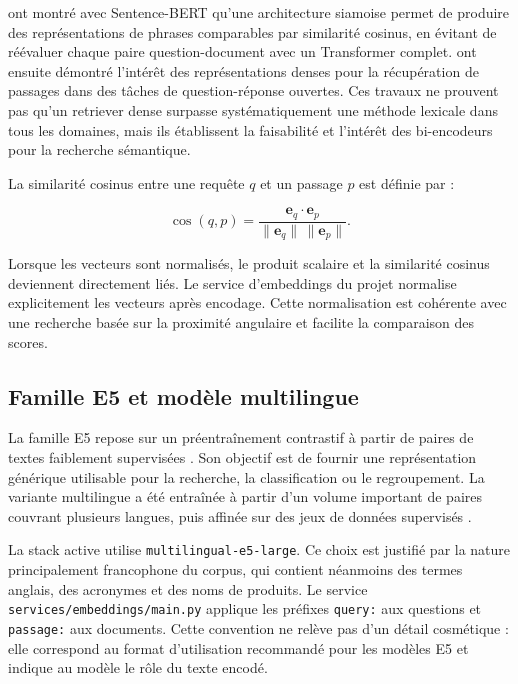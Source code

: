 \citet{Reimers2019} ont montré avec Sentence-BERT qu'une architecture siamoise permet de produire des représentations de phrases comparables par similarité cosinus, en évitant de réévaluer chaque paire question-document avec un Transformer complet. \citet{Karpukhin2020} ont ensuite démontré l'intérêt des représentations denses pour la récupération de passages dans des tâches de question-réponse ouvertes. Ces travaux ne prouvent pas qu'un retriever dense surpasse systématiquement une méthode lexicale dans tous les domaines, mais ils établissent la faisabilité et l'intérêt des bi-encodeurs pour la recherche sémantique.

La similarité cosinus entre une requête $q$ et un passage $p$ est définie par :

\begin{equation}
\operatorname{cos}(q,p)=\frac{\mathbf{e}_q\cdot\mathbf{e}_p}{\lVert\mathbf{e}_q\rVert\,\lVert\mathbf{e}_p\rVert}.
\end{equation}

Lorsque les vecteurs sont normalisés, le produit scalaire et la similarité cosinus deviennent directement liés. Le service d'embeddings du projet normalise explicitement les vecteurs après encodage. Cette normalisation est cohérente avec une recherche basée sur la proximité angulaire et facilite la comparaison des scores.

\subsection{Famille E5 et modèle multilingue}

La famille E5 repose sur un préentraînement contrastif à partir de paires de textes faiblement supervisées \citep{Wang2022E5}. Son objectif est de fournir une représentation générique utilisable pour la recherche, la classification ou le regroupement. La variante multilingue a été entraînée à partir d'un volume important de paires couvrant plusieurs langues, puis affinée sur des jeux de données supervisés \citep{Wang2024MultilingualE5}.

La stack active utilise \texttt{multilingual-e5-large}. Ce choix est justifié par la nature principalement francophone du corpus, qui contient néanmoins des termes anglais, des acronymes et des noms de produits. Le service \texttt{services/embeddings/main.py} applique les préfixes \texttt{query:} aux questions et \texttt{passage:} aux documents. Cette convention ne relève pas d'un détail cosmétique : elle correspond au format d'utilisation recommandé pour les modèles E5 et indique au modèle le rôle du texte encodé.

